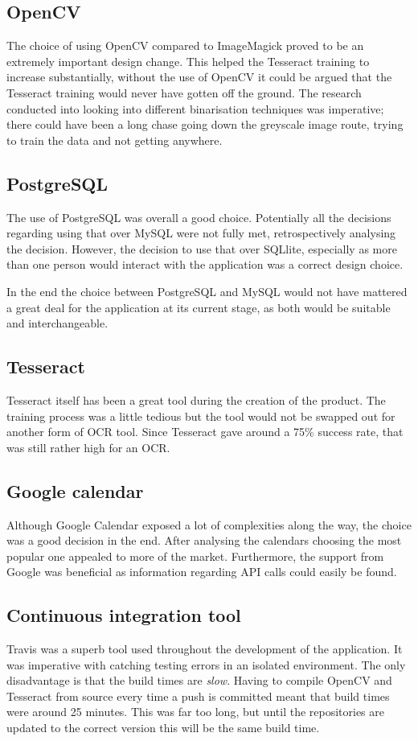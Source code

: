 \subsection{OpenCV}
The choice of using OpenCV compared to ImageMagick proved to be an extremely important design change. This helped the Tesseract training to increase substantially, without the use of OpenCV it could be argued that the Tesseract training would never have gotten off the ground. The research conducted into looking into different binarisation techniques was imperative; there could have been a long chase going down the greyscale image route, trying to train the data and not getting anywhere.

\subsection{PostgreSQL}
The use of PostgreSQL was overall a good choice. Potentially all the decisions regarding using that over MySQL were not fully met, retrospectively analysing the decision.  However, the decision to use that over SQLlite, especially as more than one person would interact with the application was a correct design choice.

In the end the choice between PostgreSQL and MySQL would not have mattered a great deal for the application at its current stage, as both would be suitable and interchangeable.

\subsection{Tesseract}
Tesseract itself has been a great tool during the creation of the product. The training process was a little tedious but the tool would not be swapped out for another form of OCR tool. Since Tesseract gave around a 75\% success rate, that was still rather high for an OCR.

\subsection{Google calendar}
Although Google Calendar exposed a lot of complexities along the way, the choice was a good decision in the end. After analysing the calendars choosing the most popular one appealed to more of the market. Furthermore, the support from Google was beneficial as information regarding API calls could easily be found.

\subsection{Continuous integration tool}
Travis was a superb tool used throughout the development of the application. It was imperative with catching testing errors in an isolated environment. The only disadvantage is that the build times are \textit{slow}. Having to compile OpenCV and Tesseract from source every time a push is committed meant that build times were around 25 minutes. This was far too long, but until the repositories are updated to the correct version this will be the same build time.


